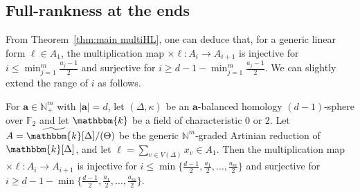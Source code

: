 \subsection{Full-rankness at the ends}
From Theorem~\ref{thm:main multiHL}, one can deduce that, for a generic linear form $\ell \in A_1$, the multiplication map $\times \ell:A_i \rightarrow A_{i+1}$ is injective for $i \leq \min_{j=1}^m \frac{a_j-1}{2}$ and surjective for $i \geq d-1-\min_{j=1}^m \frac{a_j-1}{2}$.
We can slightly extend the range of $i$ as follows. 
\begin{theorem} \label{thm:fullrank at ends}
For $\bm{a} \in \mathbb{N}^m_+$ with $|\bm{a}|=d$, let $(\Delta,\kappa)$ be an $\bm{a}$-balanced homology $(d-1)$-sphere over $\mathbb{F}_2$ and let $\mathbbm{k}$ be a field of characteristic $0$ or $2$.
Let $A=\widetilde{\mathbbm{k}}[\Delta]/(\Theta)$ be the generic $\mathbb{N}^m$-graded Artinian reduction of $\mathbbm{k}[\Delta]$, and let $\ell=\sum_{v \in V(\Delta)} x_v \in A_1$.
Then the multiplication map $\times \ell:A_i \rightarrow A_{i+1}$ is injective for $i \leq \min \{ \frac{d-1}{2}, \frac{a_1}{2},\ldots,\frac{a_m}{2} \}$ and surjective for $i \geq d-1-\min\{ \frac{d-1}{2}, \frac{a_1}{2} ,\ldots, \frac{a_m}{2} \}$.
\end{theorem}

